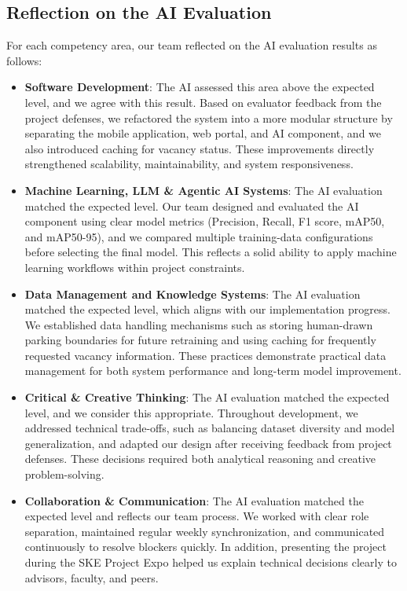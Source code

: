 \subsection{Reflection on the AI Evaluation}
\label{reflection-ai-evaluation}
For each competency area, our team reflected on the AI evaluation results as follows:
\begin{itemize}[itemsep=0.2em, topsep=0.2em, parsep=0pt, partopsep=0pt]
    \item \textbf{Software Development}: The AI assessed this area above the expected level, and we agree with this result. Based on evaluator feedback from the project defenses, we refactored the system into a more modular structure by separating the mobile application, web portal, and AI component, and we also introduced caching for vacancy status. These improvements directly strengthened scalability, maintainability, and system responsiveness.
    \item \textbf{Machine Learning, LLM \& Agentic AI Systems}: The AI evaluation matched the expected level. Our team designed and evaluated the AI component using clear model metrics (Precision, Recall, F1 score, mAP50, and mAP50-95), and we compared multiple training-data configurations before selecting the final model. This reflects a solid ability to apply machine learning workflows within project constraints.
    \item \textbf{Data Management and Knowledge Systems}: The AI evaluation matched the expected level, which aligns with our implementation progress. We established data handling mechanisms such as storing human-drawn parking boundaries for future retraining and using caching for frequently requested vacancy information. These practices demonstrate practical data management for both system performance and long-term model improvement.
    \item \textbf{Critical \& Creative Thinking}: The AI evaluation matched the expected level, and we consider this appropriate. Throughout development, we addressed technical trade-offs, such as balancing dataset diversity and model generalization, and adapted our design after receiving feedback from project defenses. These decisions required both analytical reasoning and creative problem-solving.
    \item \textbf{Collaboration \& Communication}: The AI evaluation matched the expected level and reflects our team process. We worked with clear role separation, maintained regular weekly synchronization, and communicated continuously to resolve blockers quickly. In addition, presenting the project during the SKE Project Expo helped us explain technical decisions clearly to advisors, faculty, and peers.
\end{itemize}

